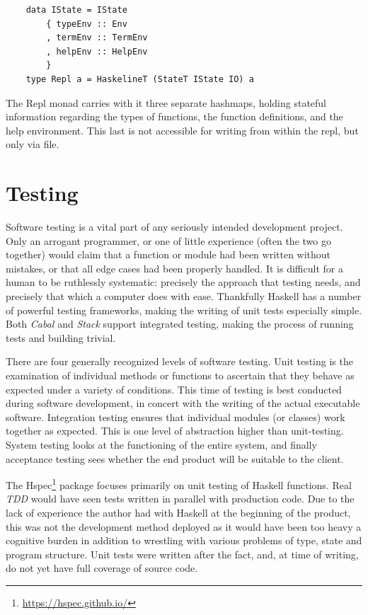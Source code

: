 \documentclass[12pt, a4paper]{report}
\begin{document}
\begin{verbatim}
    data IState = IState
        { typeEnv :: Env
        , termEnv :: TermEnv
        , helpEnv :: HelpEnv
        }
    type Repl a = HaskelineT (StateT IState IO) a
\end{verbatim}

The Repl monad carries with it three separate hashmaps, holding stateful information regarding the
types of functions, the function definitions, and the help environment. This last is not accessible
for writing from within the repl, but only via file.


\chapter{Testing}

Software testing is a vital part of any seriously intended development project. Only an arrogant
programmer, or one of little experience (often the two go together) would claim that a function or
module had been written without mistakes, or that all edge cases had been properly handled. It is
difficult for a human to be ruthlessly systematic: precisely the approach that testing needs, and
precisely that which a computer does with ease. Thankfully Haskell has a number of powerful testing
frameworks, making the writing of unit tests especially simple. Both \textit{Cabal} and
\textit{Stack} support integrated testing, making the process of running tests and building trivial.

There are four generally recognized levels of software testing. Unit testing is the examination of
individual methods or functions to ascertain that they behave as expected under a variety of
conditions. This time of testing is best conducted during software development, in concert with the
writing of the actual executable software. Integration testing ensures that individual modules (or
classes) work together as expected. This is one level of abstraction higher than unit-testing.
System testing looks at the functioning of the entire system, and finally acceptance testing sees
whether the end product will be suitable to the client. 

The Hspec\footnote{\url{https://hspec.github.io/}} package focuses primarily on unit testing of
Haskell functions. Real \textit{TDD} would have seen tests written in parallel with production code.
Due to the lack of experience the author had with Haskell at the beginning of the product, this was
not the development method deployed as it would have been too heavy a cognitive burden in addition
to wrestling with various problems of type, state and program structure. Unit tests were written
after the fact, and, at time of writing, do not yet have full coverage of source code.
\end{document}
